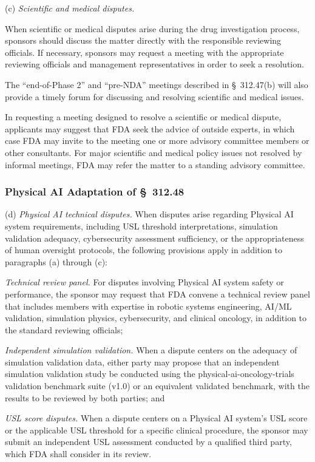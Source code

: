 (c) \textit{Scientific and medical disputes.}

\begin{description}[leftmargin=0.5cm,style=sameline]
\item[(1)] When scientific or medical disputes arise during the drug investigation process, sponsors should discuss the matter directly with the responsible reviewing officials. If necessary, sponsors may request a meeting with the appropriate reviewing officials and management representatives in order to seek a resolution.
\item[(2)] The ``end-of-Phase 2'' and ``pre-NDA'' meetings described in \S~312.47(b) will also provide a timely forum for discussing and resolving scientific and medical issues.
\item[(3)] In requesting a meeting designed to resolve a scientific or medical dispute, applicants may suggest that FDA seek the advice of outside experts, in which case FDA may invite to the meeting one or more advisory committee members or other consultants. For major scientific and medical policy issues not resolved by informal meetings, FDA may refer the matter to a standing advisory committee.
\end{description}

\subsubsection{Physical AI Adaptation of \S~312.48}

(d) \textit{Physical AI technical disputes.} When disputes arise regarding Physical AI system requirements, including USL threshold interpretations, simulation validation adequacy, cybersecurity assessment sufficiency, or the appropriateness of human oversight protocols, the following provisions apply in addition to paragraphs (a) through (c):

\begin{description}[leftmargin=0.8cm,style=sameline]
\item[(i)] \textit{Technical review panel.} For disputes involving Physical AI system safety or performance, the sponsor may request that FDA convene a technical review panel that includes members with expertise in robotic systems engineering, AI/ML validation, simulation physics, cybersecurity, and clinical oncology, in addition to the standard reviewing officials;
\item[(ii)] \textit{Independent simulation validation.} When a dispute centers on the adequacy of simulation validation data, either party may propose that an independent simulation validation study be conducted using the physical-ai-oncology-trials validation benchmark suite (v1.0) or an equivalent validated benchmark, with the results to be reviewed by both parties; and
\item[(iii)] \textit{USL score disputes.} When a dispute centers on a Physical AI system's USL score or the applicable USL threshold for a specific clinical procedure, the sponsor may submit an independent USL assessment conducted by a qualified third party, which FDA shall consider in its review.
\end{description}

